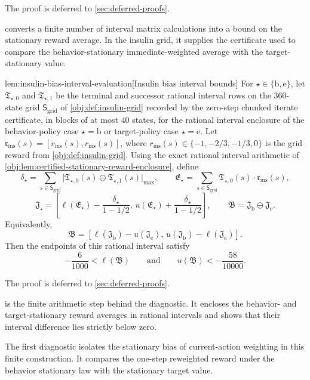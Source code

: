 \documentclass[11pt]{article}
\begin{document}
The proof is deferred to \cref{sec:deferred-proofs}.

 converts a finite number of interval matrix calculations into a bound on the stationary reward average. In the insulin grid, it supplies the certificate used to compare the behavior-stationary immediate-weighted average with the target-stationary value.

\begin{lemmav}{lem:insulin-bias-interval-evaluation}[Insulin bias interval bounds]
For \(\star\in\{\mathrm b,\mathrm e\}\), let \(\mathfrak T_{\star,0}\) and \(\mathfrak T_{\star,1}\) be the terminal and successor rational interval rows on the \(360\)-state grid \(\mathsf S_{\mathrm{grid}}\) of \cref{obj:def:insulin-grid} recorded by the zero-step chunked iterate certificate, in blocks of at most \(40\) states, for the rational interval enclosure of the behavior-policy case \(\star=\mathrm b\) or target-policy case \(\star=\mathrm e\). Let \(\mathfrak r_{\mathrm{ins}}(s)=[r_{\mathrm{ins}}(s),r_{\mathrm{ins}}(s)]\), where \(r_{\mathrm{ins}}(s)\in\{-1,-2/3,-1/3,0\}\) is the grid reward from \cref{obj:def:insulin-grid}. Using the exact rational interval arithmetic of \cref{obj:lem:certified-stationary-reward-enclosure}, define
\[
\delta_\star=\sum_{s\in\mathsf S_{\mathrm{grid}}}\bigl|\mathfrak T_{\star,0}(s)\ominus\mathfrak T_{\star,1}(s)\bigr|_{\max},
\qquad
\mathfrak E_\star=\sum_{s\in\mathsf S_{\mathrm{grid}}}\mathfrak T_{\star,0}(s)\cdot\mathfrak r_{\mathrm{ins}}(s),
\]
\[
\mathfrak J_\star=
\left[
\ell(\mathfrak E_\star)-\frac{\delta_\star}{1-1/2},
\,
u(\mathfrak E_\star)+\frac{\delta_\star}{1-1/2}
\right],
\qquad
\mathfrak B=\mathfrak J_{\mathrm b}\ominus\mathfrak J_{\mathrm e}.
\]
Equivalently,
\[
\mathfrak B=
\left[
\ell(\mathfrak J_{\mathrm b})-u(\mathfrak J_{\mathrm e}),
\,
u(\mathfrak J_{\mathrm b})-\ell(\mathfrak J_{\mathrm e})
\right].
\]
Then the endpoints of this rational interval satisfy
\[
-\frac{6}{1000}<\ell(\mathfrak B)
\qquad\text{and}\qquad
u(\mathfrak B)<-\frac{58}{10000}.
\]
\end{lemmav}

The proof is deferred to \cref{sec:deferred-proofs}.

 is the finite arithmetic step behind the diagnostic. It encloses the behavior- and target-stationary reward averages in rational intervals and shows that their interval difference lies strictly below zero.

The first diagnostic isolates the stationary bias of current-action weighting in this finite construction. It compares the one-step reweighted reward under the behavior stationary law with the stationary target value.
\end{document}
